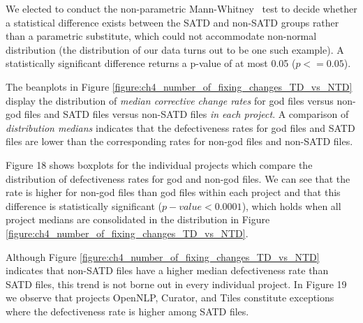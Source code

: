 We elected to conduct the non-parametric Mann-Whitney~\cite{mann1947test} test to decide whether a statistical difference exists between the SATD and non-SATD groups rather than a parametric substitute, which could not accommodate non-normal distribution (the distribution of our data turns out to be one such example). A statistically significant difference returns a p-value of at most 0.05 ($p <= 0.05$). 



The beanplots in Figure \ref{figure:ch4_number_of_fixing_changes_TD_vs_NTD} display the distribution of \textit{median corrective change rates} for god files versus non-god files and SATD files versus non-SATD files \textit{in each project}. A comparison of \textit{distribution medians} indicates that the defectiveness rates for god files and SATD files are lower than the corresponding rates for non-god files and non-SATD files.

Figure 18 shows boxplots for the individual projects which compare the distribution of defectiveness rates for god and non-god files. We can see that the rate is higher for non-god files than god files within each project and that this difference is statistically significant ($p-value < 0.0001$), which holds when all project medians are consolidated in the distribution in Figure \ref{figure:ch4_number_of_fixing_changes_TD_vs_NTD}.

Although Figure \ref{figure:ch4_number_of_fixing_changes_TD_vs_NTD} indicates that non-SATD files have a higher median defectiveness rate than SATD files, this trend is not borne out in every individual project. In Figure 19 we observe that projects OpenNLP, Curator, and Tiles constitute exceptions where the defectiveness rate is higher among SATD files.


